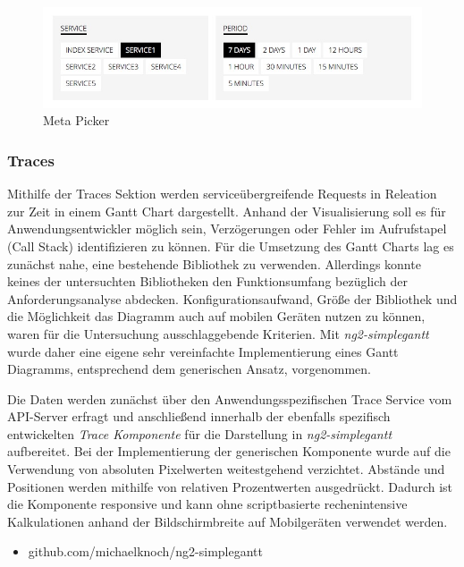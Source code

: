 


\begin{figure}[hptb]
 \centering
 \includegraphics[width=0.8\linewidth]{kapitel4/metapicker.jpg}
 \caption{Meta Picker}
 \label{metapicker}
\end{figure}
\vspace{0.3cm}


\subsubsection{Traces}

Mithilfe der Traces Sektion werden serviceübergreifende Requests in Releation zur Zeit in einem Gantt Chart dargestellt.
Anhand der Visualisierung soll es für Anwendungsentwickler möglich sein, Verzögerungen oder Fehler im Aufrufstapel (Call Stack) identifizieren zu können.
Für die Umsetzung des Gantt Charts lag es zunächst nahe, eine bestehende Bibliothek zu verwenden.
Allerdings konnte keines der untersuchten Bibliotheken den Funktionsumfang bezüglich der Anforderungsanalyse abdecken.
Konfigurationsaufwand, Größe der Bibliothek und die Möglichkeit das Diagramm auch auf mobilen Geräten nutzen zu können, waren für die Untersuchung ausschlaggebende Kriterien.
Mit \emph{ng2-simplegantt} wurde daher eine eigene sehr vereinfachte Implementierung eines Gantt Diagramms, entsprechend dem generischen Ansatz, vorgenommen.

Die Daten werden zunächst über den Anwendungsspezifischen Trace Service vom API-Server erfragt und anschließend innerhalb der ebenfalls spezifisch entwickelten \emph{Trace Komponente}
für die Darstellung in \emph{ng2-simplegantt} aufbereitet.
Bei der Implementierung der generischen Komponente wurde auf die Verwendung von absoluten Pixelwerten weitestgehend verzichtet.
Abstände und Positionen werden mithilfe von relativen Prozentwerten ausgedrückt. Dadurch ist die Komponente responsive und kann
ohne scriptbasierte rechenintensive Kalkulationen anhand der Bildschirmbreite auf Mobilgeräten verwendet werden.

\begin{itemize}
  \item{github.com/michaelknoch/ng2-simplegantt}
\end{itemize}


